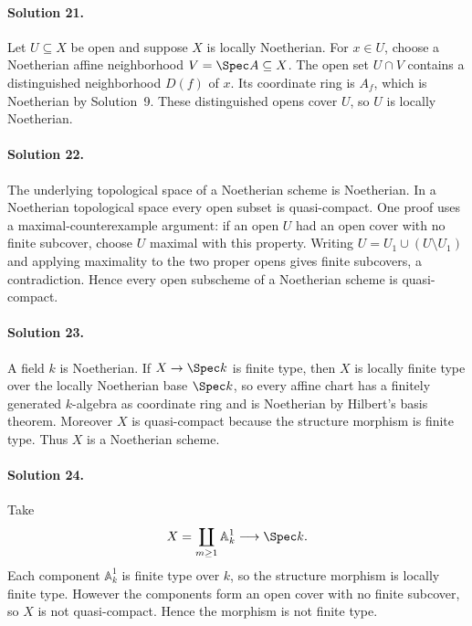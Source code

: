 \paragraph{Solution 21.}
Let \(U\subseteq X\) be open and suppose \(X\) is locally Noetherian.  For \(x\in U\), choose a
Noetherian affine neighborhood \(V=\Spec A\subseteq X\).  The open set \(U\cap V\) contains a
distinguished neighborhood \(D(f)\) of \(x\).  Its coordinate ring is \(A_f\), which is Noetherian
by Solution~9.  These distinguished opens cover \(U\), so \(U\) is locally Noetherian.

\paragraph{Solution 22.}
The underlying topological space of a Noetherian scheme is Noetherian.  In a Noetherian topological
space every open subset is quasi-compact.  One proof uses a maximal-counterexample argument: if an
open \(U\) had an open cover with no finite subcover, choose \(U\) maximal with this property.
Writing \(U=U_1\cup(U\setminus U_1)\) and applying maximality to the two proper opens gives finite
subcovers, a contradiction.  Hence every open subscheme of a Noetherian scheme is quasi-compact.

\paragraph{Solution 23.}
A field \(k\) is Noetherian.  If \(X\to\Spec k\) is finite type, then \(X\) is locally finite type
over the locally Noetherian base \(\Spec k\), so every affine chart has a finitely generated
\(k\)-algebra as coordinate ring and is Noetherian by Hilbert's basis theorem.  Moreover \(X\) is
quasi-compact because the structure morphism is finite type.  Thus \(X\) is a Noetherian scheme.

\paragraph{Solution 24.}
Take
\[
X=\coprod_{m\ge1}\mathbb A^1_k
\longrightarrow \Spec k.
\]
Each component \(\mathbb A^1_k\) is finite type over \(k\), so the structure morphism is locally
finite type.  However the components form an open cover with no finite subcover, so \(X\) is not
quasi-compact.  Hence the morphism is not finite type.

